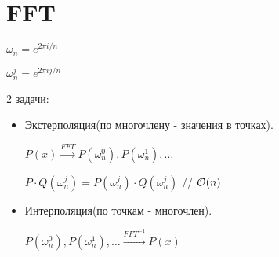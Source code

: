 \date{September 12, 2016}
\author{Bugakova Nadezhda}

\chapter{FFT}

$\omega_n = e^{2\pi i/n}$

$\omega_n^j = e^{2 \pi i j/n} $

2 задачи:
\begin{itemize}
    \item Экстерполяция(по многочлену - значения в точках).
    
    $P(x) \xrightarrow{FFT} P(\omega_n^0), P(\omega_n^1), \dots$
    
    $P \cdot Q (\omega_n^j) = P(\omega_n^j) \cdot Q(\omega_n^j)$ // $\mathcal O(n)$
    
    \item Интерполяция(по точкам - многочлен).
    
    $P(\omega_n^0), P(\omega_n^1), \dots \xrightarrow{FFT^{-1}} P(x)$
\end{itemize}

